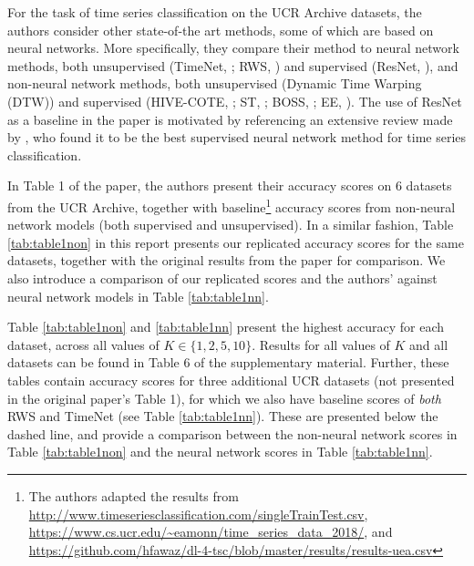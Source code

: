 \documentclass{article}
\begin{document}

For the task of time series classification on the UCR Archive datasets, the authors consider other state-of-the art methods, some of which are based on neural networks. More specifically, they compare their method to neural network methods, both unsupervised (TimeNet, \cite{TimenetMalhotraTVAS17}; RWS, \cite{RWSwu2018random}) and supervised (ResNet, \cite{ResNetHe2015}), and non-neural network methods, both unsupervised (Dynamic Time Warping (DTW)) and supervised (HIVE-COTE, \cite{hivecote}; ST, \cite{STBostrombagnall}; BOSS, \cite{BOSSSchafer:2015:BCT:2833463.2833468}; EE, \cite{EELines2015}).
The use of ResNet as a baseline in the paper is motivated by referencing an extensive review made by \cite{fawaz2019deep}, who found it to be the best supervised neural network method for time series classification.


In Table 1 of the paper, the authors present their accuracy scores on 6 datasets from the UCR Archive, together with baseline\footnote{The authors adapted the results from \url{http://www.timeseriesclassification.com/singleTrainTest.csv}, \url{https://www.cs.ucr.edu/~eamonn/time_series_data_2018/}, and \url{https://github.com/hfawaz/dl-4-tsc/blob/master/results/results-uea.csv}}
accuracy scores from non-neural network models (both supervised and unsupervised). In a similar fashion, Table \ref{tab:table1non} in this report presents our replicated accuracy scores for the same datasets, together with the original results from the paper for comparison. We also introduce a comparison of our replicated scores and the authors' against neural network models in Table \ref{tab:table1nn}.

Table \ref{tab:table1non} and \ref{tab:table1nn} present the highest accuracy  for each dataset, across all values of $K \in \{1,2,5,10\}$. Results for all values of $K$ and all datasets can be found in Table 6 of the supplementary material.
Further, these tables contain accuracy scores for three additional UCR datasets (not presented in the original paper's Table 1), for which we also have baseline scores of \textit{both} RWS and TimeNet (see Table \ref{tab:table1nn}). These are presented below the dashed line, and provide a comparison between the non-neural network scores in Table \ref{tab:table1non} and the neural network scores in Table \ref{tab:table1nn}.
\end{document}
